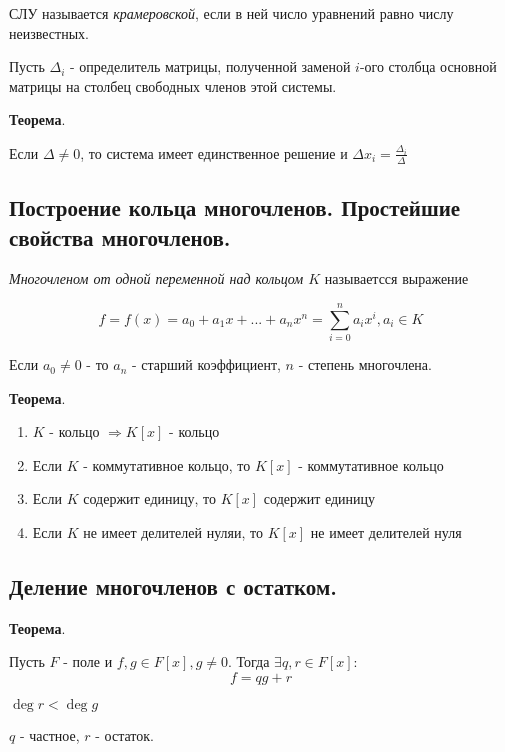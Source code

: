 \documentclass[a4paper]{article}
\begin{document}
СЛУ называется \textit{крамеровской}, если в ней число уравнений равно числу неизвестных.

Пусть $\Delta_i$ - определитель матрицы, полученной заменой $i$-ого столбца основной матрицы на столбец свободных членов этой системы.

\begin{htheorem}\textbf{Теорема}.

Если $\Delta \neq 0$, то система имеет единственное решение и $\Delta x_i = \frac{\Delta_i}{\Delta}$
\end{htheorem}

\subsection*{Построение кольца многочленов. Простейшие свойства многочленов.}

\textit{Многочленом от одной переменной над кольцом $K$} называетсся выражение  

\[ f = f(x) = a_0 + a_1x + ... + a_nx^n = \sum_{i=0}^n a_ix^i, a_i \in K \]

Если $a_0 \neq 0$ - то $a_n$ - старший коэффициент, $n$ - степень многочлена.

\begin{htheorem}\textbf{Теорема}.
\begin{enumerate}
\item $K$ - кольцо $\Rightarrow K[x]$ - кольцо
\item Если $K$ - коммутативное кольцо, то $K[x]$ - коммутативное кольцо
\item Если $K$ содержит единицу, то $K[x]$ содержит единицу
\item Если $K$ не имеет делителей нуляи, то $K[x]$ не имеет делителей нуля
\end{enumerate}

\end{htheorem}

\subsection*{Деление многочленов с остатком.}

\begin{htheorem}\textbf{Теорема}.

Пусть $F$ - поле и $f, g \in F[x], g \neq 0$. Тогда $\exists q, r \in F[x]:$
\[ f = qg + r \]

$\deg r < \deg g$

$q$ - частное, $r$ - остаток.
\end{htheorem}
\end{document}
